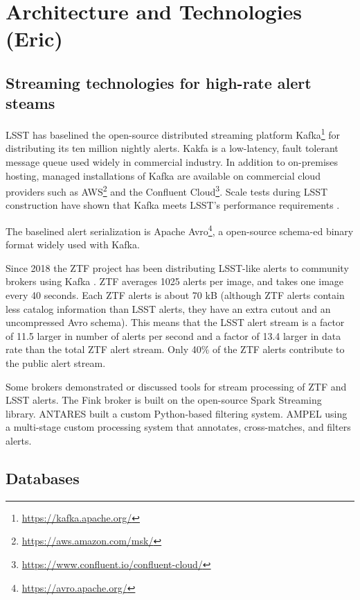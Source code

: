\section{Architecture and Technologies (Eric) } \label{sec:archandtech}

\subsection{Streaming technologies for high-rate alert steams}

LSST has baselined the open-source distributed streaming platform Kafka\footnote{\url{https://kafka.apache.org/}} for distributing its ten million nightly alerts.
Kakfa is a low-latency, fault tolerant message queue used widely in commercial industry.
In addition to on-premises hosting, managed installations of Kafka are available on commercial cloud providers such as AWS\footnote{\url{https://aws.amazon.com/msk/}} and the Confluent Cloud\footnote{\url{https://www.confluent.io/confluent-cloud/}}.
Scale tests during LSST construction have shown that Kafka meets LSST's performance requirements \citep{DMTN-028}. 

The baselined alert serialization is Apache Avro\footnote{\url{https://avro.apache.org/}}, a open-source schema-ed binary format widely used with Kafka.

Since 2018 the ZTF project has been distributing LSST-like alerts to community brokers using Kafka \citep{Patterson:19:ZTFAlerts}.
ZTF averages 1025 alerts per image, and takes one image every 40 seconds.
Each ZTF alerts is about 70 kB (although ZTF alerts contain less catalog information than LSST alerts, they have an extra cutout and an uncompressed Avro schema). 
This means that the LSST alert stream is a factor of 11.5 larger in number of alerts per second and a factor of 13.4 larger in data rate than the total ZTF alert stream.
Only 40\% of the ZTF alerts contribute to the public alert stream.

Some brokers demonstrated or discussed tools for stream processing of ZTF and LSST alerts.
The Fink broker is built on the open-source Spark Streaming library.
ANTARES built a custom Python-based filtering system.
AMPEL using a multi-stage custom processing system that annotates, cross-matches, and filters alerts.

\subsection{Databases}

